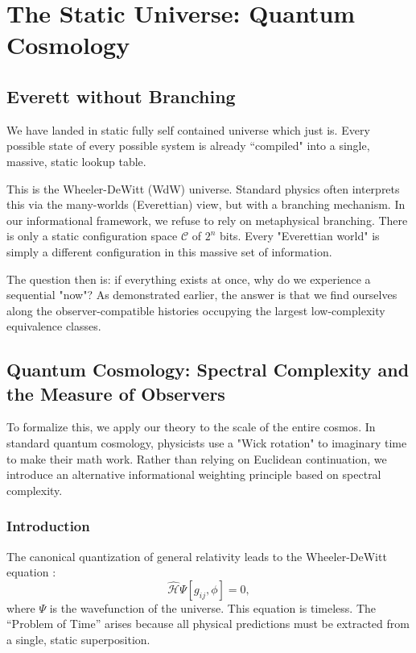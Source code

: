 \chapter{The Static Universe: Quantum Cosmology}
\label{chap:wdw}

\section{Everett without Branching}

We have landed in static fully self contained universe which just is. Every possible state of every possible system is already ``compiled" into a single, massive, static lookup table.

This is the Wheeler-DeWitt (WdW) universe. Standard physics often interprets this via the many-worlds (Everettian) view, but with a branching mechanism.
In our informational framework, we refuse to rely on metaphysical branching. There is only a static configuration space $\mathcal{C}$ of $2^n$ bits. Every "Everettian world" is simply a different
configuration in this massive set of information.

The question then is: if everything exists at once, why do we experience a sequential "now"?
As demonstrated earlier, the answer is that we find ourselves along the observer-compatible histories occupying the largest low-complexity equivalence classes.


\section{Quantum Cosmology: Spectral Complexity and the Measure of Observers}

To formalize this, we apply our theory to the scale of the entire cosmos.
In standard quantum cosmology, physicists use a "Wick rotation" to imaginary time to make their math work. 
Rather than relying on Euclidean continuation, we introduce an alternative informational weighting principle based on spectral complexity.


\subsection*{Introduction}

The canonical quantization of general relativity leads to the Wheeler-DeWitt equation \cite{DeWitt1967}:
\begin{equation}
\hat{\mathcal{H}} \Psi[g_{ij}, \phi] = 0,
\end{equation}
where $\Psi$ is the wavefunction of the universe. This equation is timeless. The ``Problem of Time'' arises because all physical predictions must be extracted from a single, static superposition.

